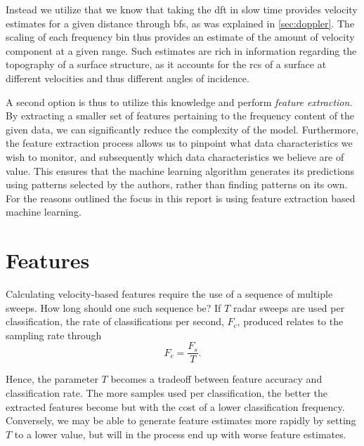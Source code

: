 Instead we utilize that we know that taking the \gls{dft} in slow time provides velocity estimates for a given distance through \gls{bf}s, as was explained in \ref{sec:doppler}. The scaling of each frequency bin thus provides an estimate of the amount of velocity component at a given range. Such estimates are rich in information regarding the topography of a surface structure, as it accounts for the \gls{rcs} of a surface at different velocities and thus different angles of incidence. 

A second option is thus to utilize this knowledge and perform \emph{feature extraction}. By extracting a smaller set of features pertaining to the frequency content of the given data, we can significantly reduce the complexity of the model. Furthermore, the feature extraction process allows us to pinpoint what data characteristics we wish to monitor, and subsequently which data characteristics we believe are of value. This ensures that the machine learning algorithm generates its predictions using patterns selected by the authors, rather than finding patterns on its own. For the reasons outlined the focus in this report is using feature extraction based machine learning. 

\section{Features}

Calculating velocity-based features require the use of a sequence of multiple sweeps. How long should one such sequence be? If $T$ radar sweeps are used per classification, the rate of classifications per second, $F_c$, produced relates to the sampling rate through
\begin{equation}
	\label{eq:classification_rate}
	F_c = \frac{F_s}{T}.
\end{equation} 

Hence, the parameter $T$ becomes a tradeoff between feature accuracy and classification rate. The more samples used per classification, the better the extracted features become but with the cost of a lower classification frequency. Conversely, we may be able to generate feature estimates more rapidly by setting $T$ to a lower value, but will in the process end up with worse feature estimates. 


